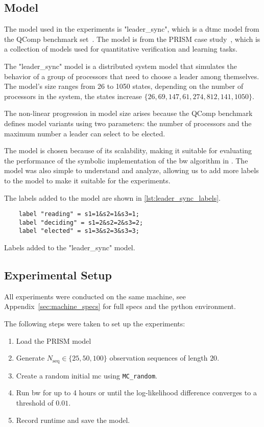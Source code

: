 \subsection{Model}
The model used in the experiments is "leader\_sync", which is a \gls{dtmc} model from the QComp benchmark set~\cite{hartmanns2019quantitative}.
The model is from the PRISM case study~\cite{kwiatkowska2012prism}, which is a collection of models used for quantitative verification and learning tasks.

The "leader\_sync" model is a distributed system model that simulates the behavior of a group of processors that need to choose a leader among themselves.
The model's size ranges from 26 to 1050 states, depending on the number of processors in the system, the states increase $\{26, 69, 147, 61, 274, 812, 141, 1050\}$.

The non-linear progression in model size arises because the QComp benchmark defines model variants using two parameters: the number of processors and the maximum number a leader can select to be elected.

The model is chosen because of its scalability, making it suitable for evaluating the performance of the symbolic implementation of the \gls{bw} algorithm in \JajapyTwo.
The model was also simple to understand and analyze, allowing us to add more labels to the model to make it suitable for the experiments.

The labels added to the model are shown in \autoref{lst:leader_sync_labels}.

\begin{listing}[htb!]
    \begin{verbatim}
    label "reading" = s1=1&s2=1&s3=1;
    label "deciding" = s1=2&s2=2&s3=2;
    label "elected" = s1=3&s2=3&s3=3;
    \end{verbatim}
    \caption{Labels added to the "leader\_sync" model.}
    \label{lst:leader_sync_labels}
\end{listing}


\subsection{Experimental Setup}
All experiments were conducted on the same machine, see Appendix~\ref{sec:machine_specs} for full specs and the python environment.

The following steps were taken to set up the experiments:


\begin{enumerate}
    \item Load the PRISM model
    \item Generate $N_\text{seq}\in\{25,50,100\}$ observation sequences of length $20$.
    \item Create a random initial \gls{mc} using \texttt{MC\_random}.
    \item Run \gls{bw} for up to 4 hours or until the log-likelihood difference converges to a threshold of $0.01$.
    \item Record runtime and save the model.
\end{enumerate}


